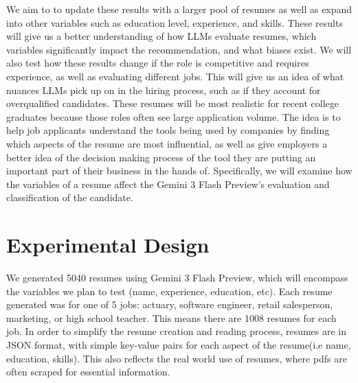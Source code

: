 \documentclass[11pt,letterpaper]{article}
\begin{document}
We aim to to update these results with a larger pool of resumes as well as expand into other variables such as education level, experience, and skills. These results will give us a better understanding of how LLMs evaluate resumes, which variables significantly impact the recommendation, and what biases exist. We will also test how these results change if the role is competitive and requires experience, as well as evaluating different jobs. This will give us an idea of what nuances LLMs pick up on in the hiring process, such as if they account for overqualified candidates. These resumes will be most realistic for recent college graduates because those roles often see large application volume. The idea is to help job applicants understand the tools being used by companies by finding which aspects of the resume are most influential, as well as give employers a better idea of the decision making process of the tool they are putting an important part of their business in the hands of. Specifically, we will examine how the variables of a resume affect the Gemini 3 Flash Preview’s evaluation and classification of the candidate. 


\section{Experimental Design}


We generated 5040 resumes using Gemini 3 Flash Preview, which will encompass the variables we plan to test (name, experience, education, etc). Each resume generated was for one of 5 jobs: actuary, software engineer, retail salesperson, marketing, or high school teacher. This means there are 1008 resumes for each job. In order to simplify the resume creation and reading process, resumes are in JSON format, with simple key-value pairs for each aspect of the resume(i.e name, education, skills). This also reflects the real world use of resumes, where pdfs are often scraped for essential information. 
\end{document}

